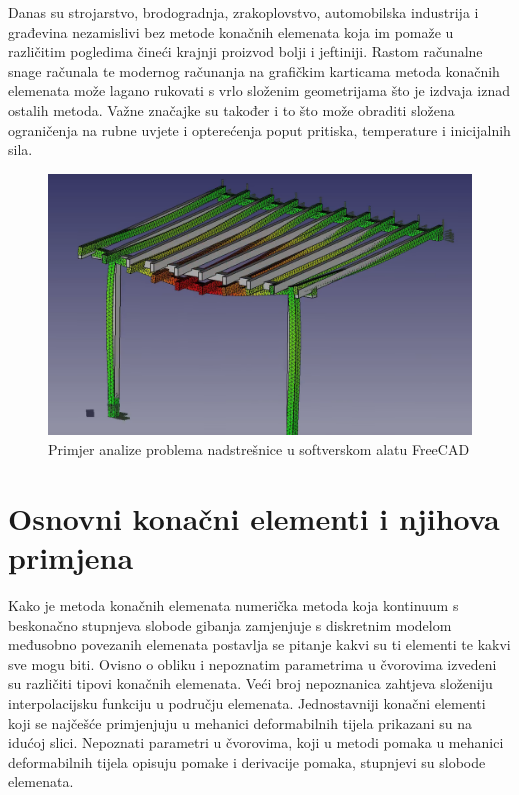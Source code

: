 \documentclass[a4paper,twoside,12pt]{memoir} %
\begin{document}
Danas su strojarstvo, brodogradnja, zrakoplovstvo, automobilska industrija i građevina nezamislivi bez metode konačnih elemenata koja im pomaže u različitim pogledima čineći krajnji proizvod bolji i jeftiniji. Rastom računalne snage računala te modernog računanja na grafičkim karticama metoda konačnih elemenata može lagano rukovati s vrlo složenim geometrijama što je izdvaja iznad ostalih metoda. Važne značajke su također i to što može obraditi složena ograničenja na rubne uvjete i opterećenja poput pritiska, temperature i inicijalnih sila.
\begin{figure}[h!t]
\begin{center}
\includegraphics[scale=0.3]{pictures/chapter_fem/FEM_primjer.png}
\caption{Primjer analize problema nadstrešnice u softverskom alatu FreeCAD \cite{youtube_freecad}}
\end{center}
\end{figure}


\section{Osnovni konačni elementi i njihova primjena}
Kako je metoda konačnih elemenata numerička metoda koja kontinuum s beskonačno stupnjeva slobode gibanja zamjenjuje s diskretnim modelom međusobno povezanih elemenata postavlja se pitanje kakvi su ti elementi te kakvi sve mogu biti. Ovisno o obliku i nepoznatim parametrima u čvorovima izvedeni su različiti tipovi konačnih elemenata. Veći broj nepoznanica zahtjeva složeniju interpolacijsku funkciju u području elemenata. Jednostavniji konačni elementi koji se najčešće primjenjuju u mehanici deformabilnih tijela prikazani su na idućoj slici. Nepoznati parametri u čvorovima, koji u metodi pomaka u mehanici deformabilnih tijela opisuju pomake i derivacije pomaka, stupnjevi su slobode elemenata. \par
\end{document}
